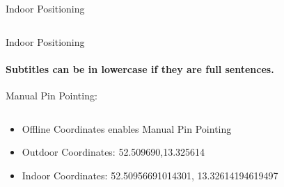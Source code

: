 \documentclass[11pt]{beamer}
\begin{document}
\begin{frame}{Indoor Positioning}
\begin{columns}[T]
\begin{column}{.4\textwidth}
  \end{column}
\end{columns}

\end{frame}

\begin{frame}{Indoor Positioning}

\framesubtitle{Subtitles can be in lowercase if they are full sentences.}
Manual Pin Pointing:

  \begin{columns}[T]
  \begin{column}{.6\textwidth}
  \begin{itemize}
 \item Offline Coordinates enables Manual Pin Pointing
 \item Outdoor Coordinates: 52.509690,13.325614
 \item Indoor Coordinates: 52.50956691014301, 13.32614194619497


\end{itemize}
\end{column}
\end{columns}
\end{frame}
\end{document}
